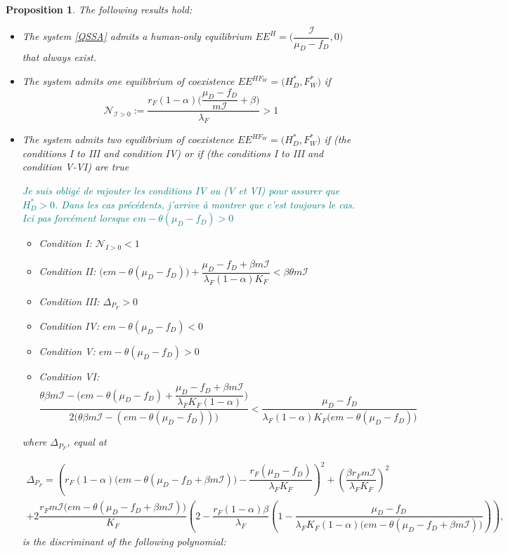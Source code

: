 \documentclass{article}
\newcommand{\lfw}{\lambda_{F}}
\newcommand{\lfw}{\lambda_{F}}
\newcommand{\cI}{\mathcal{I}}
\newcommand{\marc}[1]{\textcolor{teal}{#1}}
\newtheorem{prop}{Proposition}
\begin{document}
\begin{prop}
The following results hold:
\begin{itemize}
\item The system \eqref{QSSA} admits a human-only equilibrium $EE^{H} = \Big(\dfrac{\cI}{\mu_D - f_D},0\Big)$ that always exist.
\item The system admits one equilibrium of coexistence $EE^{HF_W} = \Big(H_D^*, F_W^* \Big)$ if $$\mathcal{N}_{\cI > 0}:= \dfrac{r_F(1-\alpha)\Big({\dfrac{\mu_D - f_D}{m\cI}+\beta\Big)}}{\lfw}  > 1$$

\item The system admits two equilibrium of coexistence $EE^{HF_W} = \Big(H_D^*, F_W^* \Big)$ if (the conditions I to III and condition IV) or if (the conditions I to III and condition V-VI) are true

\marc{Je suis obligé de rajouter les conditions IV ou (V et VI) pour assurer que $H_D^* > 0$. Dans les cas précédents, j'arrive à montrer que c'est toujours le cas. Ici pas forcément lorsque $e m - \theta(\mu_D - f_D) >0$ }

\begin{itemize}
\item Condition I: $\mathcal{N}_{I>0} < 1$
\item Condition II: $\Big(em - \theta(\mu_D-f_D) \Big) + \dfrac{\mu_D-f_D + \beta m \cI}{\lfw(1-\alpha) K_F } < \beta \theta m \cI$
\item Condition III: $\Delta_{P_F} > 0$
\item Condition IV: $e m - \theta(\mu_D - f_D) < 0$
\item Condition V: $e m - \theta(\mu_D - f_D) >0$
\item Condition VI: $\dfrac{  \theta \beta m \cI - \Big(em - \theta(\mu_D-f_D) + \dfrac{\mu_D-f_D + \beta m \cI}{\lfw K_F(1-\alpha) } \Big) }{2 \Big( \theta \beta m \cI - (em - \theta(\mu_D-f_D)) \Big)} < \dfrac{\mu_D - f_D}{\lfw (1-\alpha) K_F \Big(e m - \theta (\mu_D - f_D)  \Big) }$
\end{itemize}


where $\Delta_{P_F}$, equal at

\begin{multline*}
\Delta_{P_F} = \left(r_F (1-\alpha)   \Big(em - \theta(\mu_D-f_D + \beta m \cI)  \Big) - \dfrac{r_F(\mu_D-f_D) }{\lfw K_F} \right)^2 + \left( \dfrac{\beta r_F m \cI}{\lfw K_F}\right)^2  
\\   +  2 \dfrac{r_F m \cI \Big(e m - \theta (\mu_D - f_D + \beta m \cI)\Big)}{K_F} \left(2 - \dfrac{r_F(1-\alpha)\beta }{\lfw} \left(1 - \dfrac{\mu_D - f_D}{\lfw K_F(1-\alpha) \Big(e m - \theta (\mu_D - f_D + \beta m \cI)\Big)}\right) \right),
\end{multline*}
is the discriminant of the following polynomial:


\end{itemize}
\end{prop}
\end{document}
